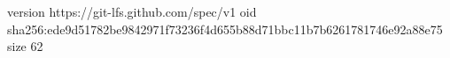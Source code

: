 version https://git-lfs.github.com/spec/v1
oid sha256:ede9d51782be9842971f73236f4d655b88d71bbc11b7b6261781746e92a88e75
size 62
